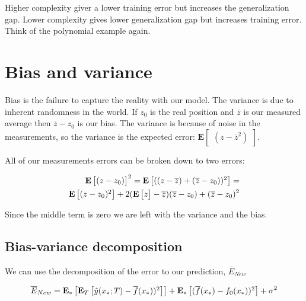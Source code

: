 Higher complexity giver a lower training error but increases the generalization gap. Lower complexity gives lower generalization gap but increases training error. Think of the polynomial example again. 


\section{Bias and variance}
Bias is the failure to capture the reality with our model. The variance is due to inherent randomness in the world. If $z_0$ is the real position and $\overline{z}$ is our measured average then $\overline{z}-z_0$ is our bias. The variance is because of noise in the measurements, so the variance is the expected error: $\textbf{E}\begin{bmatrix} (z-\overline{z}^{2}) \end{bmatrix}$. 

All of our measurements errors can be broken down to two errors: 

\begin{equation}
\begin{aligned}
\text{\textbf{E}} \begin{bmatrix} (z-z_0) \end{bmatrix}^{2} = \text{\textbf{E}} \begin{bmatrix} ((z-\overline{z})+(\overline{z}-z_0))^{2} \end{bmatrix} = \\
\text{\textbf{E}} \begin{bmatrix} (z-z_0)^{2} \end{bmatrix} + 2 ( \text{\textbf{E}}\begin{bmatrix} z \end{bmatrix} - \overline{z} )(\overline{z}-z_0) + (\overline{z}-z_0)^{2}
\end{aligned}
\end{equation}

Since the middle term is zero we are left with the variance and the bias. 


\subsection*{Bias-variance decomposition}
We can use the decomposition of the error to our prediction, $\overline{E}_{New}$ 

\begin{equation}
\overline{E}_{New} = \text{\textbf{E}}_* \begin{bmatrix} \text{\textbf{E}}_T \begin{bmatrix} \hat{y}(x_*;T)-\overline{f}(x_*))^{2} \end{bmatrix} \end{bmatrix} + \text{\textbf{E}}_* \begin{bmatrix} (\overline{f}(x_*)-f_0(x_*))^{2} \end{bmatrix} + \sigma^{2}
\end{equation}

